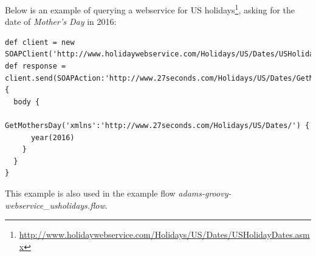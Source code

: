 \documentclass[a4paper]{book}
\begin{document}
Below is an example of querying a webservice for US
holidays\footnote{\url{http://www.holidaywebservice.com/Holidays/US/Dates/USHolidayDates.asmx}{}},
asking for the date of \textit{Mother's Day} in 2016:
{\scriptsize
\begin{verbatim}
def client = new SOAPClient('http://www.holidaywebservice.com/Holidays/US/Dates/USHolidayDates.asmx')
def response = client.send(SOAPAction:'http://www.27seconds.com/Holidays/US/Dates/GetMothersDay') {
  body {
    GetMothersDay('xmlns':'http://www.27seconds.com/Holidays/US/Dates/') {
      year(2016)
    }
  }
}
\end{verbatim}
}
\noindent This example is also used in the example flow
\textit{adams-groovy-webservice\_usholidays.flow}.



\end{document}
